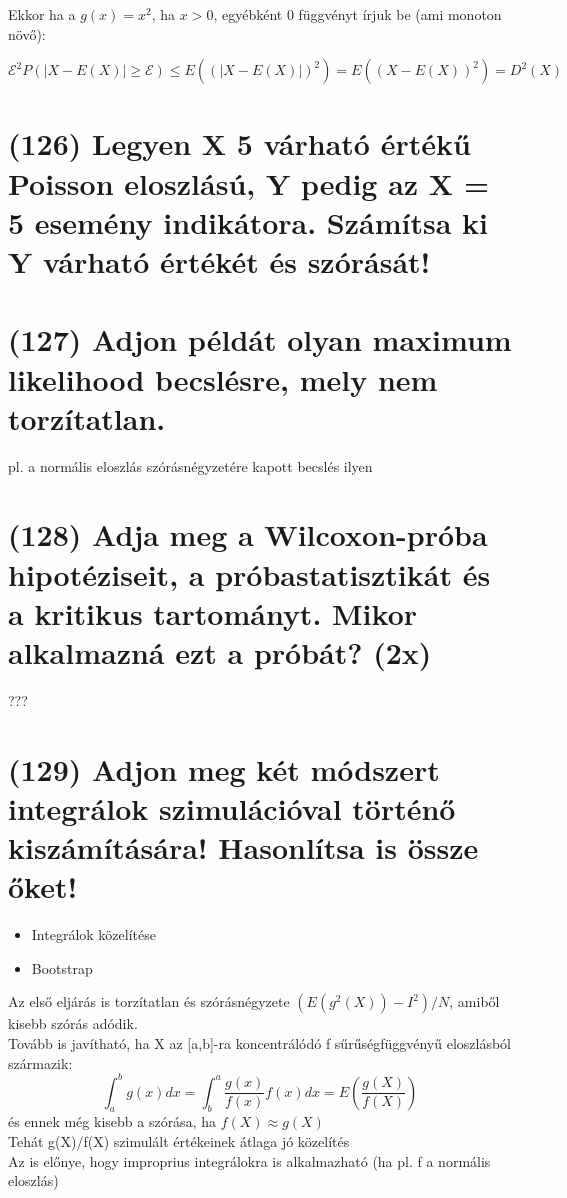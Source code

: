 \documentclass[12p]{article}
\begin{document}
Ekkor ha a $g(x) = x^2$, ha $x > 0$, egyébként 0 függvényt írjuk be (ami monoton növő):

$$\mathcal{E}^2P(|X - E(X)| \geq \mathcal{E}) \leq E((|X - E(X)|)^2) = E((X - E(X))^2) = D^2(X)$$

\section{(126) Legyen X 5 várható értékű Poisson eloszlású, Y pedig az X = 5 esemény indikátora. Számítsa ki Y várható értékét és szórását!}

\section{(127) Adjon példát olyan maximum likelihood becslésre, mely nem torzítatlan.}

pl. a normális eloszlás szórásnégyzetére kapott becslés ilyen

\section{(128) Adja meg a Wilcoxon-próba hipotéziseit, a próbastatisztikát és a kritikus tartományt.
Mikor alkalmazná ezt a próbát? (2x)}

???

\section{(129) Adjon meg két módszert integrálok szimulációval történő kiszámítására! Hasonlítsa is
össze őket!}

\begin{itemize}
\item Integrálok közelítése
\item Bootstrap
\end{itemize}

Az első eljárás is torzítatlan és szórásnégyzete $(E(g^2(X)) - I^2) / N$, amiből kisebb szórás adódik.\\
Tovább is javítható, ha X az [a,b]-ra koncentrálódó f sűrűségfüggvényű eloszlásból származik:
$$\int^b_a g(x)dx = \int^a_b \frac{g(x)}{f(x)} f(x)dx = E (\frac{g(X)}{f(X)})$$
és ennek még kisebb a szórása, ha $f(X) \approx g(X)$\\
Tehát g(X)/f(X) szimulált értékeinek átlaga jó közelítés\\
Az is előnye, hogy improprius integrálokra is alkalmazható (ha pl. f a normális eloszlás)
\end{document}
